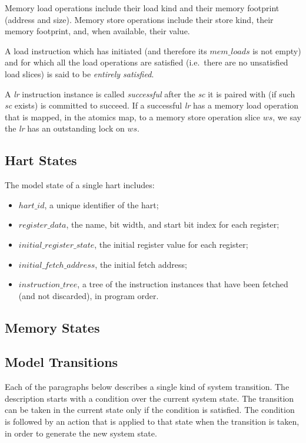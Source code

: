 Memory load operations include their load kind and their memory footprint (address and size).
%
Memory store operations include their store kind, their memory footprint, and, when available, their value.

A load instruction which has initiated (and therefore its $mem\_loads$ is not empty) and for which all the load operations are satisfied (i.e.~there are no unsatisfied load slices) is said to be {\em entirely satisfied}.

A {\em lr} instruction instance is called {\em successful} after the {\em sc} it is paired with (if such {\em sc} exists) is committed to succeed.
If a successful {\em lr} has a memory load operation that is mapped, in the atomics map, to a memory store operation slice $ws$, we say the {\em lr} has an outstanding lock on $ws$. 


\subsection{Hart States}
The model state of a single hart includes:
\begin{itemize}
\item $hart\_id$, a unique identifier of the hart;
\item $register\_data$, the name, bit width, and start bit index for each register;
\item $initial\_register\_state$, the initial register value for each register;
\item $initial\_fetch\_address$, the initial fetch address;
\item $instruction\_tree$, a tree of the instruction instances that have been fetched (and not discarded), in program order.
\end{itemize}

\subsection{Memory States}

\subsection{Model Transitions}\label{sec:omm:hart_trans}

Each of the paragraphs below describes a single kind of system transition.
The description starts with a condition over the current system state.
The transition can be taken in the current state only if the condition is satisfied.
The condition is followed by an action that is applied to that state when the transition is taken, in order to generate the new system state.

